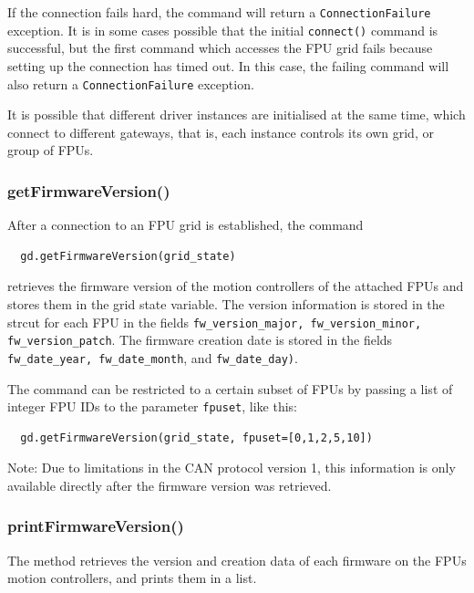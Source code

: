 \documentclass[11pt,a4paper]{scrartcl}
\begin{document}
If the connection fails hard, the command will return a
\texttt{ConnectionFailure} exception.  It is in some cases possible
that the initial \texttt{connect()} command is successful, but the
first command which accesses the FPU grid fails because setting up the
connection has timed out. In this case, the failing command will
also return a \texttt{ConnectionFailure} exception.

It is possible that different driver instances are initialised at the
same time, which connect to different gateways, that is, each instance
controls its own grid, or group of FPUs.

\subsubsection{getFirmwareVersion()}
\label{sec:getfirmwareversion}

After a connection to an FPU grid is established, the command
\begin{verbatim}
  gd.getFirmwareVersion(grid_state)
\end{verbatim}
retrieves the firmware version of the motion controllers of the
attached FPUs and stores them in the grid state variable. The version
information is stored in the strcut for each FPU in the fields
\texttt{fw\_version\_major, fw\_version\_minor, fw\_version\_patch}.
The firmware creation date is stored in the fields
\texttt{fw\_date\_year, fw\_date\_month}, and \texttt{fw\_date\_day)}.

The command can be restricted to a certain subset of FPUs
by passing a list of integer FPU IDs to the parameter
\texttt{fpuset}, like this:
  
\begin{verbatim}
  gd.getFirmwareVersion(grid_state, fpuset=[0,1,2,5,10])
\end{verbatim}

Note: Due to limitations in the CAN protocol version 1, this
information is only available directly after the firmware version was
retrieved.


\subsubsection{printFirmwareVersion()}
\label{sec:printfirmwareversion}

The method retrieves the version and creation data of each firmware on
the FPUs motion controllers, and prints them in a list.
\end{document}
